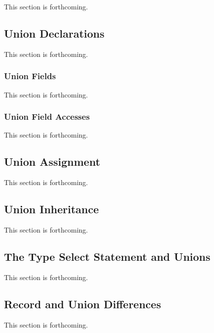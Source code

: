 \label{Unions}

This section is forthcoming.

\subsection{Union Declarations}
\label{Union_Declarations}

This section is forthcoming.

\subsubsection{Union Fields}
\label{Union_Fields}

This section is forthcoming.

\subsubsection{Union Field Accesses}
\label{Union_Field_Accesses}

This section is forthcoming.

\subsection{Union Assignment}
\label{Union_Assignment}

This section is forthcoming.

\subsection{Union Inheritance}
\label{Union_Inheritance}

This section is forthcoming.

\subsection{The Type Select Statement and Unions}
\label{The_Type_Select_Statement_and_Unions}

This section is forthcoming.

\subsection{Record and Union Differences}
\label{Record_and_Union_Differences}

This section is forthcoming.
